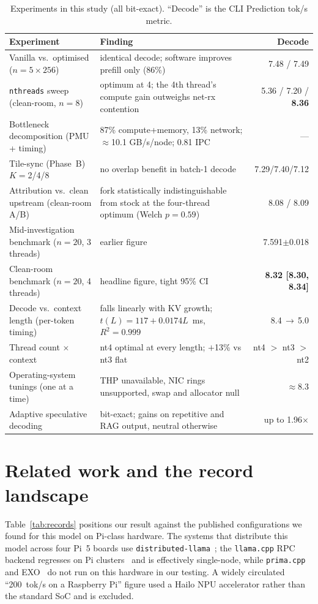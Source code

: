 \documentclass[10pt,a4paper]{article}
\begin{document}
\begin{table}[H]
\centering\small
\caption{Experiments in this study (all bit-exact). ``Decode'' is the CLI Prediction tok/s metric.}
\label{tab:trajectory}
\begin{tabularx}{\textwidth}{p{4.5cm}Xr}
\toprule
\textbf{Experiment} & \textbf{Finding} & \textbf{Decode} \\
\midrule
Vanilla vs.\ optimised ($n{=}5{\times}256$) & identical decode; software improves prefill only (86\%) & 7.48 / 7.49 \\
\texttt{nthreads} sweep (clean-room, $n{=}8$) & optimum at 4; the 4th thread's compute gain outweighs net-rx contention & 5.36 / 7.20 / \textbf{8.36} \\
Bottleneck decomposition (PMU + timing) & 87\% compute+memory, 13\% network; $\approx$10.1 GB/s/node; 0.81 IPC & --- \\
Tile-sync (Phase~B) $K{=}$2/4/8 & no overlap benefit in batch-1 decode & 7.29/7.40/7.12 \\
Attribution vs.\ clean upstream (clean-room A/B) & fork statistically indistinguishable from stock at the four-thread optimum (Welch $p{=}0.59$) & 8.08 / 8.09 \\
Mid-investigation benchmark ($n{=}20$, 3 threads) & earlier figure & 7.591$\pm$0.018 \\
Clean-room benchmark ($n{=}20$, 4 threads) & headline figure, tight 95\% CI & \textbf{8.32 [8.30, 8.34]} \\
Decode vs.\ context length (per-token timing) & falls linearly with KV growth; $t(L){=}117{+}0.0174L$~ms, $R^2{=}0.999$ & 8.4$\,\to\,$5.0 \\
Thread count $\times$ context & nt4 optimal at every length; $+$13\% vs nt3 flat & nt4 $>$ nt3 $>$ nt2 \\
Operating-system tunings (one at a time) & THP unavailable, NIC rings unsupported, swap and allocator null & $\approx$8.3 \\
Adaptive speculative decoding & bit-exact; gains on repetitive and RAG output, neutral otherwise & up to 1.96$\times$ \\
\bottomrule
\end{tabularx}
\end{table}

\section{Related work and the record landscape}
\label{sec:related}
Table~\ref{tab:records} positions our result against the published configurations we found for this model on Pi-class hardware. The systems that distribute this model across four Pi~5 boards use \texttt{distributed-llama}~\citep{tadych2024}; the \texttt{llama.cpp} RPC backend regresses on Pi clusters~\citep{geerling2025} and is effectively single-node, while \texttt{prima.cpp}~\citep{li2025prima} and EXO~\citep{exo2025} do not run on this hardware in our testing. A widely circulated ``200~tok/s on a Raspberry Pi'' figure used a Hailo NPU accelerator rather than the standard SoC and is excluded.
\end{document}
